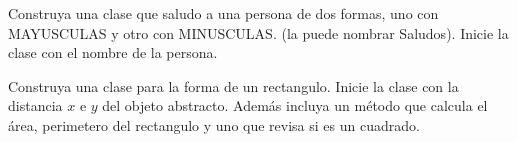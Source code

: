 \documentclass[11pt]{exam}
\begin{document}
\firstpageheadrule
\runningheadrule
{}
\cfoot{ }
\begin{flushleft}
\vspace{0.2in}

\vspace{0.25cm}
\end{flushleft}

\begin{questions}
%
%

\item Construya una clase que saludo a una persona de dos formas, 
      uno con MAYUSCULAS y otro con MINUSCULAS. (la puede nombrar Saludos). 
      Inicie la clase con el nombre de la persona. 

\item Construya una clase para la forma de un rectangulo. Inicie la 
      clase con la distancia $x$ e $y$ del objeto abstracto. Además incluya un método
      que calcula el área, perimetero del rectangulo y uno que revisa si es un cuadrado.


\end{questions}
\end{document}
